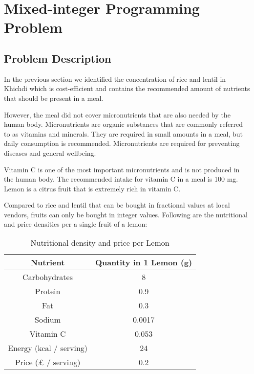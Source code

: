 \documentclass[
]{article}
\begin{document}
\newpage

\hypertarget{mixed-integer-programming-problem}{%
	\section{Mixed-integer Programming
	 Problem}\label{mixed-integer-programming-problem}}

\hypertarget{problem-description-1}{%
	\subsection{Problem Description}\label{problem-description-1}}

In the previous section we identified the concentration of rice and lentil in Khichdi which
is cost-efficient and contains the recommended amount of nutrients that should be present in a meal.

However, the meal did not cover micronutrients that are also needed by the human body.
Micronutrients are organic substances that are commonly referred to as vitamins and minerals.
They are required in small amounts in a meal, but daily consumption is recommended.
Micronutrients are required for preventing diseases and general wellbeing.

Vitamin C is one of the most important micronutrients and is not produced in the human body.
The recommended intake for vitamin C in a meal is 100 mg. Lemon is a citrus fruit that is
extremely rich in vitamin C. 

Compared to rice and lentil that can be bought in fractional values at local vendors, fruits can only be bought in integer values.
Following are the nutritional and price densities per a single fruit of a lemon:

\begin{table}[h!]
	\centering
	\begin{tabular}{||c | c ||} 
		\hline
		Nutrient                & Quantity in 1 Lemon (g) \\ [1ex] 
		\hline\hline
		Carbohydrates           & 8                       \\
		Protein                 & 0.9                     \\
		Fat                     & 0.3                     \\
		Sodium                  & 0.0017                  \\
		Vitamin C               & 0.053                   \\ [1ex] 
		\hline
		Energy (kcal / serving) & 24                      \\ 
		\hline
		Price (£ / serving)    & 0.2                     \\ [1ex] 
		\hline
	\end{tabular}
	\caption{Nutritional density and price per Lemon}
	\label{table}
\end{table}
\end{document}
